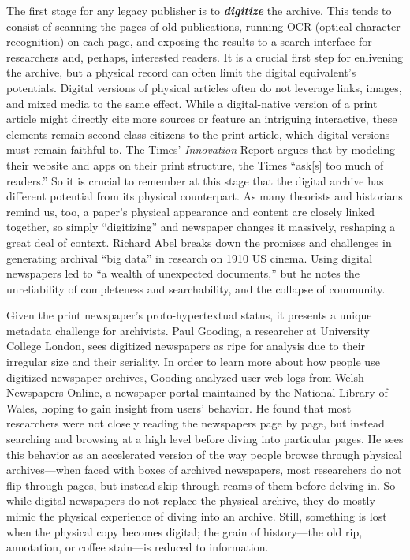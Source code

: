 The first stage for any legacy publisher is to \textbf{\emph{digitize}} the archive. This tends to consist of scanning the pages of old publications, running OCR (optical character recognition) on each page, and exposing the results to a search interface for researchers and, perhaps, interested readers. It is a crucial first step for enlivening the archive, but a physical record can often limit the digital equivalent's potentials. Digital versions of physical articles often do not leverage links, images, and mixed media to the same effect. While a digital-native version of a print article might directly cite more sources or feature an intriguing interactive, these elements remain second-class citizens to the print article, which digital versions must remain faithful to. The Times' \emph{Innovation} Report argues that by modeling their website and apps on their print structure, the Times ``ask[s] too much of readers.''\autocite[26]{_innovation_2014} So it is crucial to remember at this stage that the digital archive has different potential from its physical counterpart. As many theorists and historians remind us, too, a paper's physical appearance and content are closely linked together, so simply ``digitizing'' and newspaper changes it massively, reshaping a great deal of context.\autocite[388-389]{mussell_elemental_2014,manoff_archive_2010} Richard Abel breaks down the promises and challenges in generating archival ``big data'' in research on 1910 US cinema. Using digital newspapers led to ``a wealth of unexpected documents,'' but he notes the unreliability of completeness and searchability, and the collapse of community.\autocite{abel_pleasures_2013}

Given the print newspaper's proto-hypertextual status, it presents a unique metadata challenge for archivists. Paul Gooding, a researcher at University College London, sees digitized newspapers as ripe for analysis due to their irregular size and their seriality.\autocite{gooding_exploring_2014} In order to learn more about how people use digitized newspaper archives, Gooding analyzed user web logs from Welsh Newspapers Online, a newspaper portal maintained by the National Library of Wales, hoping to gain insight from users' behavior. He found that most researchers were not closely reading the newspapers page by page, but instead searching and browsing at a high level before diving into particular pages. He sees this behavior as an accelerated version of the way people browse through physical archives---when faced with boxes of archived newspapers, most researchers do not flip through pages, but instead skip through reams of them before delving in. So while digital newspapers do not replace the physical archive, they do mostly mimic the physical experience of diving into an archive. Still, something is lost when the physical copy becomes digital; the grain of history---the old rip, annotation, or coffee stain---is reduced to information.

